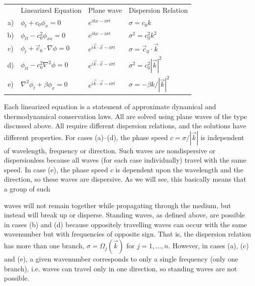 \begin{center}
	\begin{tabular}{c@{\quad}l@{\quad}l@{\quad}l}
		   & Linearized Equation                  & Plane wave          & Dispersion Relation \\[3pt]
		a) & $\phi_t+c_0\phi_x=0$
		   & $e^{ikx-i\sigma t}$                  & $\sigma=c_0k$                             \\
		b) & $\phi_{tt}-c_0^2\phi_{xx}=0$
		   & $e^{ikx-i\sigma t}$                  & $\sigma^2=c_0^2k^2$                       \\
		c) & $\phi_t+\vec c_0\cdot\nabla\phi=0$
		   & $e^{i\vec{k}\cdot\vec{x}-i\sigma t}$
		   & $\sigma=\vec c_0\cdot\vec{k}$                                                    \\
		d) & $\phi_{tt}-c_0^2\nabla^2\phi=0$
		   & $e^{i\vec{k}\cdot\vec{x}-i\sigma t}$
		   & $\sigma^2=c_0^2|\vec{k}|^2$                                                      \\
		e) & $\nabla^2\phi_t+\beta\phi_x=0$
		   & $e^{i\vec{k}\cdot\vec{x}-i\sigma t}$
		   & $\sigma=-\beta k/|\vec{k}|^2$
	\end{tabular}
\end{center}

Each linearized equation is a statement of approximate dynamical and thermodynamical
conservation laws. All are solved using plane waves of the type discussed above. All
require different dispersion relations, and the solutions have different properties. For
cases (a)--(d), the phase speed $c=\sigma/|\vec{k}|$ is independent of wavelength,
frequency or direction. Such waves are nondispersive or dispersionless because all waves
(for each case individually) travel with the same speed. In case (e), the phase speed $c$
is dependent upon the wavelength and the direction, so these waves are dispersive. As we
will see, this basically means that a group of such

\sourcepagebreak

waves will not remain together while propagating through the medium, but instead will
break up or disperse. Standing waves, as defined above, are possible in cases (b) and
(d) because oppositely travelling waves can occur with the same wavenumber but with
frequencies of opposite sign. That is, the dispersion relation has more than one branch,
$\sigma=\Omega_j(\vec{k})$ for $j=1,\ldots,n$. However, in cases (a), (c) and (e), a
given wavenumber corresponds to only a single frequency (only one branch), i.e. waves
can travel only in one direction, so standing waves are not possible.

